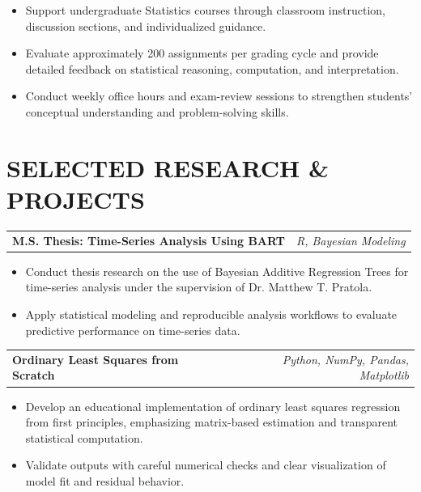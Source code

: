 \documentclass[10pt,letterpaper]{article}
\makeatletter
\newcommand{\projectEntry}[2]{%
  \begin{tabularx}{\textwidth}{@{}Xr@{}}
    \textbf{#1} & \textit{#2}
  \end{tabularx}%
}
\newenvironment{resumeItems}{%
  \begin{itemize}[
    label=\textbullet,
    leftmargin=14pt,
    labelsep=5pt,
    itemsep=0.5pt,
    topsep=1.0pt,
    parsep=0pt,
    partopsep=0pt
  ]
}{%
  \end{itemize}
}
\makeatother
\begin{document}
\begin{resumeItems}
  \item Support undergraduate Statistics courses through classroom instruction, discussion sections, and individualized guidance.

  \item Evaluate approximately 200 assignments per grading cycle and provide detailed feedback on statistical reasoning, computation, and interpretation.

  \item Conduct weekly office hours and exam-review sessions to strengthen students' conceptual understanding and problem-solving skills.
\end{resumeItems}

\section*{SELECTED RESEARCH \& PROJECTS}

\projectEntry
  {M.S. Thesis: Time-Series Analysis Using BART}
  {R, Bayesian Modeling}

\begin{resumeItems}
  \item Conduct thesis research on the use of Bayesian Additive Regression Trees for time-series analysis under the supervision of Dr. Matthew T. Pratola.

  \item Apply statistical modeling and reproducible analysis workflows to evaluate predictive performance on time-series data.
\end{resumeItems}

\vspace{0.7pt}

\projectEntry
  {Ordinary Least Squares from Scratch}
  {Python, NumPy, Pandas, Matplotlib}

\begin{resumeItems}
  \item Develop an educational implementation of ordinary least squares regression from first principles, emphasizing matrix-based estimation and transparent statistical computation.

  \item Validate outputs with careful numerical checks and clear visualization of model fit and residual behavior.
\end{resumeItems}
\end{document}
